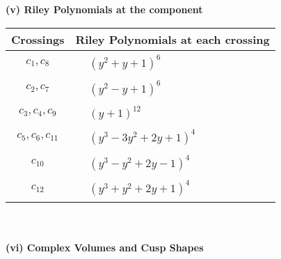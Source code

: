 \documentclass[1p]{elsarticle_modified}
\theoremstyle{definition}
\begin{document}
\newpage\renewcommand{\arraystretch}{1}
\flushleft \textbf{(v) Riley Polynomials at the component}\newline \\
\begin{tabular}{m{50pt}|m{274pt}}
Crossings & \hspace{64pt}Riley Polynomials at each crossing \\
\hline $$\begin{aligned}c_{1},c_{8}\end{aligned}$$&$\begin{aligned}
&(y^2+y+1)^6
\end{aligned}$\\
\hline $$\begin{aligned}c_{2},c_{7}\end{aligned}$$&$\begin{aligned}
&(y^2- y+1)^6
\end{aligned}$\\
\hline $$\begin{aligned}c_{3},c_{4},c_{9}\end{aligned}$$&$\begin{aligned}
&(y+1)^{12}
\end{aligned}$\\
\hline $$\begin{aligned}c_{5},c_{6},c_{11}\end{aligned}$$&$\begin{aligned}
&(y^3-3 y^2+2 y+1)^4
\end{aligned}$\\
\hline $$\begin{aligned}c_{10}\end{aligned}$$&$\begin{aligned}
&(y^3- y^2+2 y-1)^4
\end{aligned}$\\
\hline $$\begin{aligned}c_{12}\end{aligned}$$&$\begin{aligned}
&(y^3+y^2+2 y+1)^4
\end{aligned}$\\
\hline
\end{tabular}\\~\\
\newpage\flushleft \textbf{(vi) Complex Volumes and Cusp Shapes}
\end{document}
